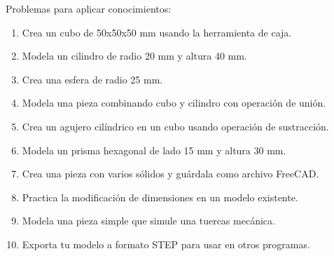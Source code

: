 Problemas para aplicar conocimientos:
\begin{enumerate}
	\item Crea un cubo de 50x50x50 mm usando la herramienta
	      de caja.
	\item Modela un cilindro de radio 20 mm y altura 40 mm.
	\item Crea una esfera de radio 25 mm.
	\item Modela una pieza combinando cubo y cilindro con
	      operación de unión.
	\item Crea un agujero cilíndrico en un cubo usando
	      operación de sustracción.
	\item Modela un prisma hexagonal de lado 15 mm y altura
	      30 mm.
	\item Crea una pieza con varios sólidos y guárdala como
	      archivo FreeCAD.
	\item Practica la modificación de dimensiones en un
	      modelo existente.
	\item Modela una pieza simple que simule una tuercas
	      mecánica.
	\item Exporta tu modelo a formato STEP para usar en
	      otros programas.
\end{enumerate}